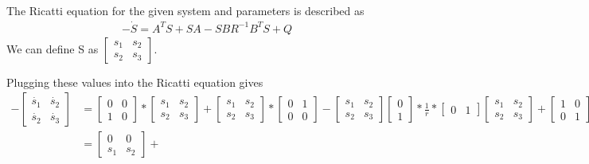 \documentclass{article}
\begin{document}
  The Ricatti equation for the given system and parameters is described as
  \begin{align*}
	  -\dot{S}=A^TS+SA-SBR^{-1}B^TS+Q
  \end{align*}
  We can define S as 
  $\begin{bmatrix}
	  s_1 & s_2 \\
          s_2 & s_3
  \end{bmatrix}$.

  Plugging these values into the Ricatti equation gives
  \begin{align*}
	  -\begin{bmatrix}
		  \dot{s_1} & \dot{s_2} \\
		  \dot{s_2} & \dot{s_3}
	  \end{bmatrix} &=
	  \begin{bmatrix}
		  0 & 0 \\
		  1 & 0
	  \end{bmatrix} *
	  \begin{bmatrix}
		  s_1 & s_2 \\
		  s_2 & s_3
	  \end{bmatrix} + 
	  \begin{bmatrix}
		  s_1 & s_2 \\
		  s_2 & s_3
	  \end{bmatrix} *
	  \begin{bmatrix}
		  0 & 1 \\
		  0 & 0
	  \end{bmatrix} -
	  \begin{bmatrix}
		  s_1 & s_2 \\
		  s_2 & s_3
	  \end{bmatrix}
	  \begin{bmatrix}
		  0 \\
		  1
	  \end{bmatrix} * \frac{1}{r} * 
	  \begin{bmatrix}
		  0 & 1
	  \end{bmatrix}
	  \begin{bmatrix}
		  s_1 & s_2 \\
		  s_2 & s_3
	  \end{bmatrix} +
	  \begin{bmatrix}
		  1 & 0 \\
		  0 & 1
	  \end{bmatrix} \\
          &=\begin{bmatrix}
		  0 & 0 \\
		  s_1 & s_2
	  \end{bmatrix} + 

\end{align*}
\end{document}
